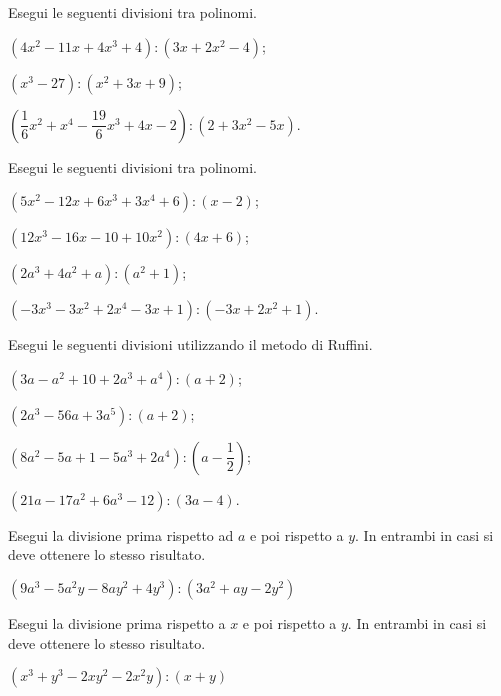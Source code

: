 \begin{esercizio}[\Ast]
\label{ese:11.61}
Esegui le seguenti divisioni tra polinomi.
 \begin{enumeratea}
 \item $\left(4x^{2}-11x+4x^{3}+4\right):\left(3x+2x^{2}-4\right)$;
 \item $\left(x^{3}-27\right):\left(x^{2}+3x+9\right)$;
 \item $\left(\dfrac{1}{6}x^{2}+x^{4}-\dfrac{19}{6}x^{3}+4x-2\right):\left(2+3x^{2}-5x\right)$.
 \end{enumeratea}
\end{esercizio}

\begin{esercizio}[\Ast]
\label{ese:11.62}
Esegui le seguenti divisioni tra polinomi.
 \begin{enumeratea}
 \item $\left(5x^{2}-12x+6x^{3}+3x^{4}+6\right):(x-2)$;
 \item $\left(12x^{3}-16x-10+10x^{2}\right):(4x+6)$;
 \item $\left(2a^{3}+4a^{2}+a\right):\left(a^{2}+1\right)$;
 \item $\left(-3x^{3}-3x^{2}+2x^{4}-3x+1\right):\left(-3x+2x^{2}+1\right)$.
 \end{enumeratea}
\end{esercizio}

\begin{esercizio}[\Ast]
\label{ese:11.63}
Esegui le seguenti divisioni utilizzando il metodo di Ruffini.
 \begin{enumeratea}
 \item $\left(3a-a^{2}+10+2a^{3}+a^{4}\right):(a+2)$;
 \item $\left(2a^{3}-56a+3a^{5}\right):(a+2)$;
 \item $\left(8a^{2}-5a+1-5a^{3}+2a^{4}\right):\left(a-\dfrac{1}{2}\right)$;
 \item $\left(21a-17a^{2}+6a^{3}-12\right):(3a-4)$.
 \end{enumeratea}
\end{esercizio}

\begin{esercizio}[\Ast]
\label{ese:11.64}
Esegui la divisione prima rispetto ad $a$ e poi rispetto a $y$. In entrambi in casi si deve ottenere lo stesso risultato.

$\left(9a^{3}-5a^{2}y-8ay^{2}+4y^{3}\right):\left(3a^{2}+ay-2y^{2}\right)$
\end{esercizio}

\begin{esercizio}[\Ast]
\label{ese:11.65}
Esegui la divisione prima rispetto a $x$ e poi rispetto a $y$. In entrambi in casi si deve ottenere lo stesso risultato.

$\left(x^{3}+y^{3}-2xy^{2}-2x^{2}y\right):(x+y)$
\end{esercizio}
\newpage
